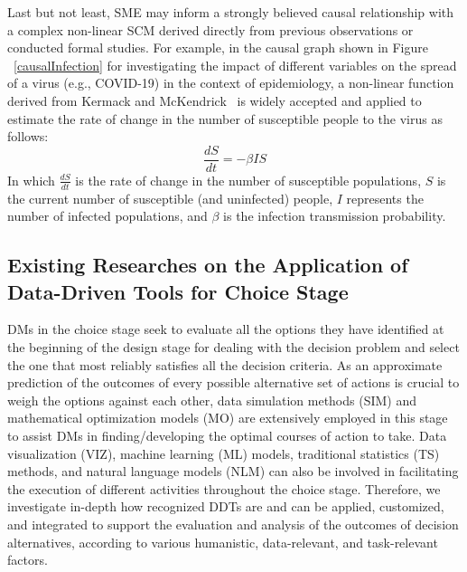 \documentclass{sfuthesis}
\begin{document}
Last but not least, SME may inform a strongly believed causal relationship with a complex non-linear SCM derived directly from previous observations or conducted formal studies. For example, in the causal graph shown in Figure ~\ref{causalInfection} for investigating the impact of different variables on the spread of a virus (e.g., COVID-19) in the context of epidemiology, a non-linear function derived from Kermack and McKendrick~\cite{kermack1927contribution} is widely accepted and applied to estimate the rate of change in the number of susceptible people to the virus as follows:
\begin{equation}
    \frac{dS}{dt}=-\beta I S
\end{equation}
In which $\frac{dS}{dt}$ is the rate of change in the number of susceptible populations, $S$ is the current number of susceptible (and uninfected) people, $I$ represents the number of infected populations, and $\beta$ is the infection transmission probability.

\subsection{Existing Researches on the Application of Data-Driven Tools for Choice Stage} \label{ExistingResearchChoice}
DMs in the choice stage seek to evaluate all the options they have identified at the beginning of the design stage for dealing with the decision problem and select the one that most reliably satisfies all the decision criteria. As an approximate prediction of the outcomes of every possible alternative set of actions is crucial to weigh the options against each other, data simulation methods (SIM) and mathematical optimization models (MO) are extensively employed in this stage to assist DMs in finding/developing the optimal courses of action to take. Data visualization (VIZ), machine learning (ML) models, traditional statistics (TS) methods, and natural language models (NLM) can also be involved in facilitating the execution of different activities throughout the choice stage. Therefore, we investigate in-depth how recognized DDTs are and can be applied, customized, and integrated to support the evaluation and analysis of the outcomes of decision alternatives, according to various humanistic, data-relevant, and task-relevant factors. 
\end{document}
